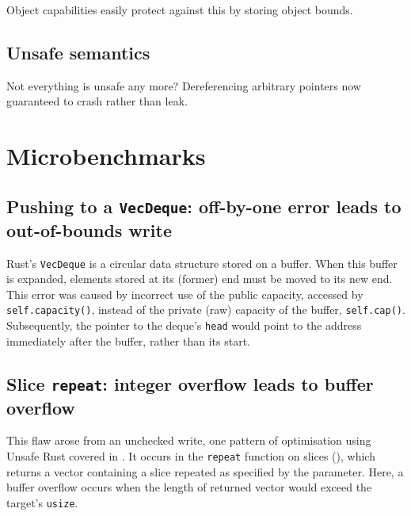 \documentclass[dissertation.tex]{subfiles}
\begin{document}
Object capabilities easily protect against this by storing object
bounds.


\subsection{Unsafe semantics}
Not everything is unsafe any more? Dereferencing arbitrary pointers now
guaranteed to crash rather than leak.


\section{Microbenchmarks}
\label{sec:eval-micro}




\subsection{Pushing to a \texttt{VecDeque}: off-by-one error leads to out-of-bounds write}
\label{sec:eval-micro-push}

Rust's \texttt{VecDeque} is a circular data structure stored on a
buffer.
When this buffer is expanded, elements stored at its (former) end must
be moved to its new end.
This error was caused by incorrect use of the public capacity, accessed
by \texttt{self.capacity()}, instead of the private (raw) capacity of
the buffer, \texttt{self.cap()}.
Subsequently, the pointer to the deque's \texttt{head} would point to
the address immediately after the buffer, rather than its start.



\subsection{Slice \texttt{repeat}: integer overflow leads to buffer overflow}
\label{sec:eval-micro-repeat}

This flaw arose from an unchecked write, one pattern of optimisation
using Unsafe Rust covered in .
It occurs in the \texttt{repeat} function on slices
(), which returns a vector containing a slice
repeated as specified by the parameter.
Here, a buffer overflow occurs when the length of returned vector would
exceed the target's \texttt{usize}.
\end{document}
